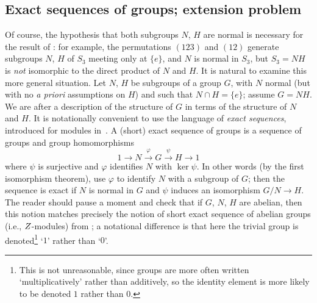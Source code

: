 \subsection{Exact sequences of groups; extension problem}
\label{subsec:groups2:exact-sequences-of-groups-extension-problem}
Of course, the hypothesis that both subgroups $N$, $H$ are normal is
necessary for the result of : for example, the
permutations $(123)$ and $(12)$ generate subgroups $N$, $H$ of $S_3$
meeting only at $\{e\}$, and $N$ is normal in $S_3$, but $S_3 = NH$ is
\emph{not} isomorphic to the direct product of $N$ and $H$. It is
natural to examine this more general situation.  Let $N$, $H$ be
subgroups of a group $G$, with $N$ normal (but with no \emph{a priori}
assumptions on $H$) and such that $N \cap H = \{e\}$; assume $G =
NH$. We are after a description of the structure of $G$ in terms of
the structure of $N$ and $H$.  It is notationally convenient to use
the language of \emph{exact sequences}, introduced for modules
in~. A (short)
exact sequence of groups is a sequence of groups and group
homomorphisms
\[1 \longrightarrow N \xrightarrow{\varphi} G \xrightarrow{\psi} H
  \longrightarrow 1\] where $\psi$ is surjective and $\varphi$
identifies $N$ with $\ker\psi$. In other words (by the first
isomorphism theorem), use $\varphi$ to identify $N$ with a subgroup of
$G$; then the sequence is exact if $N$ is normal in $G$ and $\psi$
induces an isomorphism $G/N \to H$.  The reader should pause a moment
and check that if $G$, $N$, $H$ are abelian, then this notion matches
precisely the notion of short exact sequence of abelian groups (i.e.,
$Z$-modules) from
; a notational
difference is that here the trivial group is denoted\footnote{This is
  not unreasonable, since groups are more often written
  `multiplicatively' rather than additively, so the identity element
  is more likely to be denoted $1$ rather than $0$.}  `$1$' rather
than `$0$'.

